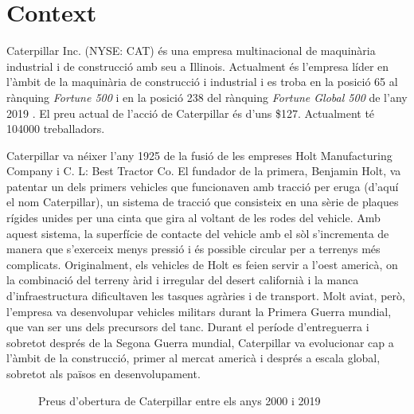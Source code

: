 \documentclass{article}
\numberwithin{table}{section}
\numberwithin{figure}{section}
\numberwithin{equation}{section}
\begin{document}
\section{Context}
Caterpillar Inc. (NYSE: CAT) és una empresa multinacional de maquinària industrial i de construcció amb seu a Illinois. Actualment és l'empresa líder en l'àmbit de la maquinària de construcció i industrial \cite{cat} i es troba en la posició 65 al rànquing \emph{Fortune 500} i en la posició 238 del rànquing \emph{Fortune Global 500} de l'any 2019 \cite{fortune,global}. El preu actual de l'acció de Caterpillar és d'uns \$127. Actualment té \num{104000} treballadors. 

Caterpillar va néixer l'any 1925 de la fusió de les empreses Holt Manufacturing Company i C. L: Best Tractor Co. El fundador de la primera, Benjamin Holt, va patentar un dels primers vehicles que funcionaven amb tracció per eruga (d'aquí el nom Caterpillar), un sistema de tracció que consisteix en una sèrie de plaques rígides unides per una cinta que gira al voltant de les rodes del vehicle. Amb aquest sistema, la superfície de contacte del vehicle amb el sòl s'incrementa de manera que s'exerceix menys pressió i és possible circular per a terrenys més complicats. Originalment, els vehicles de Holt es feien servir a l'oest americà, on la combinació del terreny àrid i irregular del desert californià i la manca d'infraestructura dificultaven les tasques agràries i de transport. Molt aviat, però, l'empresa va desenvolupar vehicles militars durant la Primera Guerra mundial, que van ser uns dels precursors del tanc. Durant el període d'entreguerra i sobretot després de la Segona Guerra mundial, Caterpillar va evolucionar cap a l'àmbit de la construcció, primer al mercat americà i després a escala global, sobretot als països en desenvolupament. 

\begin{figure}[htb]
	\centering \sffamily \small
	
	\caption{Preus d'obertura de Caterpillar entre els anys 2000 i 2019}
	\label{fig:tancament}
\end{figure}
\end{document}
